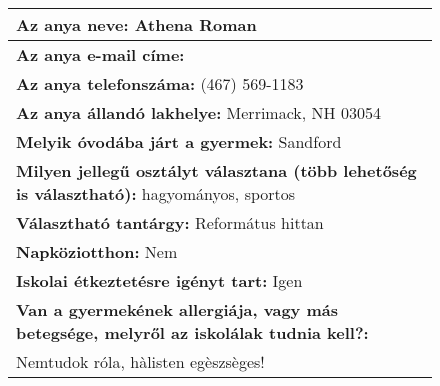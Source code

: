 \documentclass[10pt,a4paper]{article}
\begin{document}
\begin{figure}[!ht]
\begin{tabular}{|m{\textwidth}|}
\hline\vspace{3pt}
\textbf{Az anya neve:} \hspace{0.5cm} Athena Roman \vspace{3pt} \\
\hline\vspace{3pt}
\textbf{Az anya e-mail címe:} \hspace{0.5cm}   \vspace{3pt} \\
\hline\vspace{3pt}
\textbf{Az anya telefonszáma:} \hspace{0.5cm} (467) 569-1183 \vspace{3pt} \\
\hline\vspace{3pt}
\textbf{Az anya állandó lakhelye:} \hspace{0.5cm} Merrimack, NH 03054 \vspace{3pt} \\
\hline\vspace{3pt}
\textbf{Melyik óvodába járt a gyermek:} \hspace{0.5cm} Sandford \vspace{3pt} \\
\hline\vspace{3pt}
\textbf{Milyen jellegű osztályt választana (több lehetőség is választható):} \hspace{0.5cm} hagyományos, sportos \vspace{3pt} \\
\hline\vspace{3pt}
\textbf{Választható tantárgy:} \hspace{0.5cm} Református hittan \vspace{3pt} \\
\hline\vspace{3pt}
\textbf{Napköziotthon:} \hspace{0.5cm} Nem \vspace{3pt} \\
\hline\vspace{3pt}
\textbf{Iskolai étkeztetésre igényt tart:} \hspace{0.5cm} Igen \vspace{3pt} \\
\hline\vspace{3pt}
\textbf{Van a gyermekének allergiája, vagy más betegsége, melyről az iskolálak tudnia kell?:} \\ \hspace{0.5cm} Nemtudok róla, hàlisten egèszsèges! \vspace{3pt} \\

\end{tabular}
\end{figure}
\end{document}

